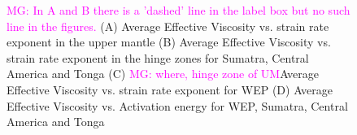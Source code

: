 \documentclass[12pt]{article}
\newcommand{\mgnote}[1]{\textcolor{magenta}{MG: #1}}
\begin{document}
{\begin{figure}[H]
\centering
\hspace{-0.2cm}
\hspace{-0.2cm}
\hspace{-0.2cm}
\hspace{-0.2cm}
\caption{
\mgnote{In A and B there is a 'dashed' line in the label box but no such line in the figures.}
(A) Average Effective Viscosity vs. strain rate exponent in the upper mantle  
(B)  Average Effective Viscosity vs. strain rate exponent in the hinge zones  for Sumatra, Central America and Tonga
(C) \mgnote{where, hinge zone of UM}Average Effective Viscosity vs. strain rate exponent for WEP (D) Average Effective Viscosity vs. Activation energy for WEP, Sumatra, Central America and Tonga}
\label{fig:shear_smaller}
\end{figure}

}
\end{document}
